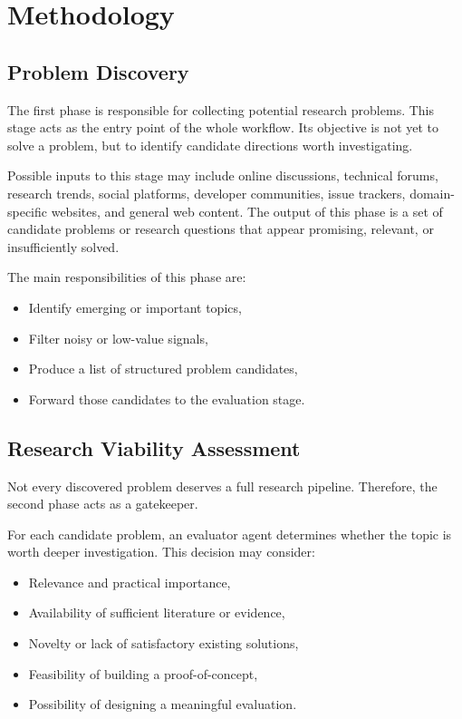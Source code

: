 \documentclass[11pt,a4paper]{article}
\begin{document}
\section{Methodology}

\subsection{Problem Discovery}

The first phase is responsible for collecting potential research problems. This stage acts as the entry point of the whole workflow. Its objective is not yet to solve a problem, but to identify candidate directions worth investigating.

Possible inputs to this stage may include online discussions, technical forums, research trends, social platforms, developer communities, issue trackers, domain-specific websites, and general web content. The output of this phase is a set of candidate problems or research questions that appear promising, relevant, or insufficiently solved.

The main responsibilities of this phase are:
\begin{itemize}
    \item Identify emerging or important topics,
    \item Filter noisy or low-value signals,
    \item Produce a list of structured problem candidates,
    \item Forward those candidates to the evaluation stage.
\end{itemize}

\subsection{Research Viability Assessment}

Not every discovered problem deserves a full research pipeline. Therefore, the second phase acts as a gatekeeper.

For each candidate problem, an evaluator agent determines whether the topic is worth deeper investigation. This decision may consider:
\begin{itemize}
    \item Relevance and practical importance,
    \item Availability of sufficient literature or evidence,
    \item Novelty or lack of satisfactory existing solutions,
    \item Feasibility of building a proof-of-concept,
    \item Possibility of designing a meaningful evaluation.
\end{itemize}
\end{document}
